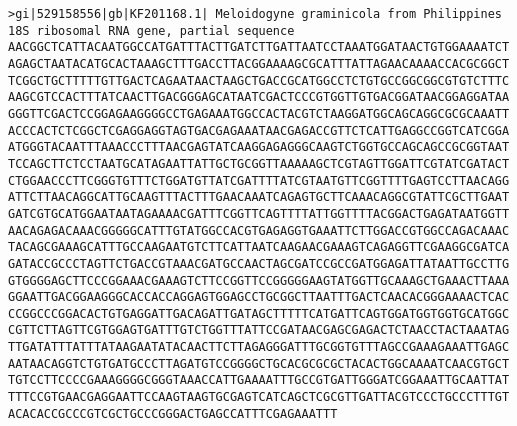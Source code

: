 \documentclass[11pt]{article}
\begin{document}
\begin{Verbatim}[commandchars=\\\{\}]
>gi|529158556|gb|KF201168.1| Meloidogyne graminicola from Philippines 18S ribosomal RNA gene, partial sequence
AACGGCTCATTACAATGGCCATGATTTACTTGATCTTGATTAATCCTAAATGGATAACTGTGGAAAATCT
AGAGCTAATACATGCACTAAAGCTTTGACCTTACGGAAAAGCGCATTTATTAGAACAAAACCACGCGGCT
TCGGCTGCTTTTTGTTGACTCAGAATAACTAAGCTGACCGCATGGCCTCTGTGCCGGCGGCGTGTCTTTC
AAGCGTCCACTTTATCAACTTGACGGGAGCATAATCGACTCCCGTGGTTGTGACGGATAACGGAGGATAA
GGGTTCGACTCCGGAGAAGGGGCCTGAGAAATGGCCACTACGTCTAAGGATGGCAGCAGGCGCGCAAATT
ACCCACTCTCGGCTCGAGGAGGTAGTGACGAGAAATAACGAGACCGTTCTCATTGAGGCCGGTCATCGGA
ATGGGTACAATTTAAACCCTTTAACGAGTATCAAGGAGAGGGCAAGTCTGGTGCCAGCAGCCGCGGTAAT
TCCAGCTTCTCCTAATGCATAGAATTATTGCTGCGGTTAAAAAGCTCGTAGTTGGATTCGTATCGATACT
CTGGAACCCTTCGGGTGTTTCTGGATGTTATCGATTTTATCGTAATGTTCGGTTTTGAGTCCTTAACAGG
ATTCTTAACAGGCATTGCAAGTTTACTTTGAACAAATCAGAGTGCTTCAAACAGGCGTATTCGCTTGAAT
GATCGTGCATGGAATAATAGAAAACGATTTCGGTTCAGTTTTATTGGTTTTACGGACTGAGATAATGGTT
AACAGAGACAAACGGGGGCATTTGTATGGCCACGTGAGAGGTGAAATTCTTGGACCGTGGCCAGACAAAC
TACAGCGAAAGCATTTGCCAAGAATGTCTTCATTAATCAAGAACGAAAGTCAGAGGTTCGAAGGCGATCA
GATACCGCCCTAGTTCTGACCGTAAACGATGCCAACTAGCGATCCGCCGATGGAGATTATAATTGCCTTG
GTGGGGAGCTTCCCGGAAACGAAAGTCTTCCGGTTCCGGGGGAAGTATGGTTGCAAAGCTGAAACTTAAA
GGAATTGACGGAAGGGCACCACCAGGAGTGGAGCCTGCGGCTTAATTTGACTCAACACGGGAAAACTCAC
CCGGCCCGGACACTGTGAGGATTGACAGATTGATAGCTTTTTCATGATTCAGTGGATGGTGGTGCATGGC
CGTTCTTAGTTCGTGGAGTGATTTGTCTGGTTTATTCCGATAACGAGCGAGACTCTAACCTACTAAATAG
TTGATATTTATTTATAAGAATATACAACTTCTTAGAGGGATTTGCGGTGTTTAGCCGAAAGAAATTGAGC
AATAACAGGTCTGTGATGCCCTTAGATGTCCGGGGCTGCACGCGCGCTACACTGGCAAAATCAACGTGCT
TGTCCTTCCCCGAAAGGGGCGGGTAAACCATTGAAAATTTGCCGTGATTGGGATCGGAAATTGCAATTAT
TTTCCGTGAACGAGGAATTCCAAGTAAGTGCGAGTCATCAGCTCGCGTTGATTACGTCCCTGCCCTTTGT
ACACACCGCCCGTCGCTGCCCGGGACTGAGCCATTTCGAGAAATTT


\end{Verbatim}
\end{document}
